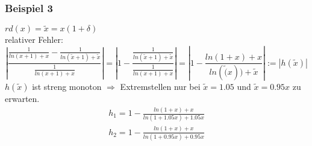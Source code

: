 \subsubsection{Beispiel 3}
$ rd(x) = \tilde{x} = x(1 + \delta) $ \\
relativer Fehler: \\
\begin{equation*}
| \frac{\frac{1}{ln(x + 1) + x} - \frac{1}{ln(\tilde{x} + 1) + \tilde{x}} }{\frac{1}{ln(x + 1) + x}} | =
| 1 - \frac{\frac{1}{ln(\tilde{x} + 1) + \tilde{x}} }{\frac{1}{ln(x + 1) + x}} | =
| 1 - \frac{ln(1 + x) +x}{ln(\tilde(x)) + \tilde{x}} | := | h(\tilde{x}) |
\end{equation*}
$ h(\tilde{x}) $ ist streng monoton $ \Rightarrow $ Extremstellen nur bei 
$ \tilde{x} = 1.05 $ und $ \tilde{x} = 0.95x $ zu erwarten. \\
\begin{equation*}
\begin{split}
  h_1 = 1 - \frac{ln(1 + x) + x}{ln(1 + 1.05x) + 1.05x} \\
  h_2 = 1 - \frac{ln(1 + x) + x}{ln(1 + 0.95x) + 0.95x}
\end{split}
\end{equation*}

